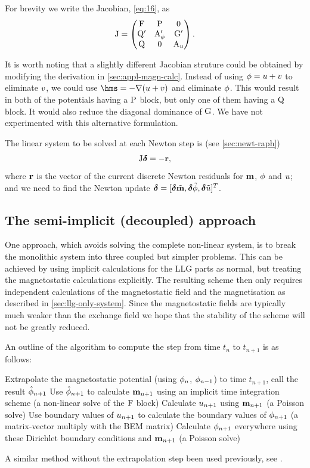 For brevity we write the Jacobian, \cref{eq:16}, as
\begin{equation}
  \mathrm{J} =
  \begin{pmatrix}
    \mathrm{F}       & \mathrm{P}     &  0 \\
    \mathrm{Q}' &   \mathrm{A}_\phi' &  \mathrm{G}'  \\
    \mathrm{Q}       &  0       &   \mathrm{A}_u
  \end{pmatrix}.
\end{equation}


It is worth noting that a slightly different Jacobian struture could be obtained by modifying the derivation in \cref{sec:appl-magn-calc}.
Instead of using $\phi = u + v$ to eliminate $v$, we could use $\hms = - \grad ( \phione + \phitwo)$ and eliminate $\phi$.
This would result in both of the potentials having a $\mathrm{P}$ block, but only one of them having a $\mathrm{Q}$ block.
It would also reduce the diagonal dominance of ${\mathbf{\mathrm{G}}}$.
We have not experimented with this alternative formulation.

The linear system to be solved at each Newton step is (see \cref{sec:newt-raph})
\begin{equation}
  \mathrm{J} \boldsymbol{\mathrm{\delta}} = -\boldsymbol{\mathrm{r}},
  \label{eq:87}
\end{equation}
where $\boldsymbol{\mathrm{r}}$ is the vector of the current discrete Newton residuals for $\boldsymbol{\mathrm{m}}$, $\phi$ and $u$; and we need to find the Newton update $\boldsymbol{\mathrm{\delta}} = [\boldsymbol{\mathrm{\delta}}\tilde{\boldsymbol{\mathrm{m}}}, \boldsymbol{\mathrm{\delta}}\tilde{\phi}, \boldsymbol{\mathrm{\delta}}\tilde{u}]^T$.


\subsection{The semi-implicit (decoupled) approach}
\label{sec:semi-implicit-bem}

One approach, which avoids solving the complete non-linear system, is to break the monolithic system into three coupled but simpler problems.
This can be achieved by using implicit calculations for the LLG parts as normal, but treating the magnetostatic calculations explicitly.
The resulting scheme then only requires independent calculations of the magnetostatic field and the magnetisation as described in \cref{sec:llg-only-system}.
Since the magnetostatic fields are typically much weaker than the exchange field we hope that the stability of the scheme will not be greatly reduced.

An outline of the algorithm to compute the step from time $t_n$ to $t_{n+1}$ is as follows:
\begin{algorithm}[H]
  Extrapolate the magnetostatic potential (using $\phi_n$, $\phi_{n-1}$) to time $t_{n+1}$, call the result $\hat{\phi}_{n+1}$\;
  Use $\hat{\phi}_{n+1}$ to calculate $\boldsymbol{\mathrm{m}}_{n+1}$ using an implicit time integration scheme (a non-linear solve of the $\mathrm{F}$ block)\;
  Calculate $u_{n+1}$ using $\boldsymbol{\mathrm{m}}_{n+1}$ (a Poisson solve)\;
  Use boundary values of $u_{n+1}$ to calculate the boundary values of $\phi_{n+1}$ (a matrix-vector multiply with the BEM matrix)\;
  Calculate $\phi_{n+1}$ everywhere using these Dirichlet boundary conditions and $\boldsymbol{\mathrm{m}}_{n+1}$ (a Poisson solve)\;
\end{algorithm}
A similar method without the extrapolation step been used previously, see \eg \cite{Schrefl1997}.

